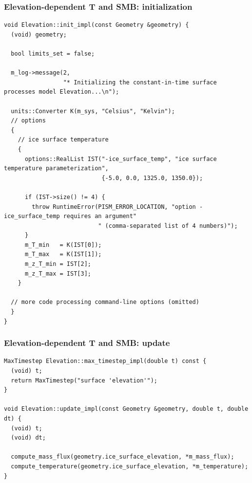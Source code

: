 \documentclass[hide notes,intlimits]{beamer}
\begin{document}
\begin{frame}
  \frametitle{Elevation-dependent T and SMB: initialization}

\begin{lstlisting}
void Elevation::init_impl(const Geometry &geometry) {
  (void) geometry;

  bool limits_set = false;

  m_log->message(2,
                 "* Initializing the constant-in-time surface processes model Elevation...\n");

  units::Converter K(m_sys, "Celsius", "Kelvin");
  // options
  {
    // ice surface temperature
    {
      options::RealList IST("-ice_surface_temp", "ice surface temperature parameterization",
                            {-5.0, 0.0, 1325.0, 1350.0});

      if (IST->size() != 4) {
        throw RuntimeError(PISM_ERROR_LOCATION, "option -ice_surface_temp requires an argument"
                           " (comma-separated list of 4 numbers)");
      }
      m_T_min   = K(IST[0]);
      m_T_max   = K(IST[1]);
      m_z_T_min = IST[2];
      m_z_T_max = IST[3];
    }

  // more code processing command-line options (omitted)
  }
}

\end{lstlisting}
\end{frame}

\begin{frame}[fragile]
  \frametitle{Elevation-dependent T and SMB: update}
\begin{lstlisting}
MaxTimestep Elevation::max_timestep_impl(double t) const {
  (void) t;
  return MaxTimestep("surface 'elevation'");
}

void Elevation::update_impl(const Geometry &geometry, double t, double dt) {
  (void) t;
  (void) dt;

  compute_mass_flux(geometry.ice_surface_elevation, *m_mass_flux);
  compute_temperature(geometry.ice_surface_elevation, *m_temperature);
}
\end{lstlisting}
\end{frame}
\end{document}
